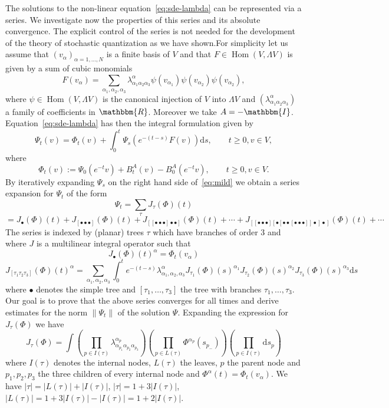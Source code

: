 \documentclass[11pt]{article}
\newcommand{\assign}{:=}
\newcommand{\mathd}{\mathrm{d}}
\newcommand{\tmop}[1]{\ensuremath{\operatorname{#1}}}
\begin{document}
The solutions to the non-linear equation~{\eqref{eq:sde-lambda}} can be
represented via a series. We investigate now the properties of this series and
its absolute convergence. The explicit control of the series is not needed for
the development of the theory of stochastic quantization as we have
shown.\quad For simplicity let us assume that $(v_{\alpha})_{\alpha = 1,
\ldots, N}$ is a finite basis of $V$ and that $F \in \tmop{Hom} (V, \Lambda
V)$ is given by a sum of cubic monomials
\[ F (v_{\alpha}) = \sum_{\alpha_1, \alpha_2, \alpha_3}
   \lambda^{\alpha}_{\alpha_1 \alpha_2 \alpha_3} \psi (v_{\alpha_1}) \psi
   (v_{\alpha_2}) \psi (v_{\alpha_2}), \]
where $\psi \in \tmop{Hom} (V, \Lambda V)$ is the canonical injection of $V$
into $\Lambda V$ and $(\lambda^{\alpha}_{\alpha_1 \alpha_2 \alpha_3})$ a
family of coefficients in $\mathbbm{R}$. Moreover we take $A = -\mathbbm{I}$.
Equation~{\eqref{eq:sde-lambda}} has then the integral formulation given by
\begin{equation}
  \Psi_t (v) = \Phi_t (v) + \int_0^t \Psi_s (e^{- (t - s)} F (v)) \mathd s,
  \qquad t \geqslant 0, v \in V, \label{eq:mild}
\end{equation}
where
\[ \Phi_t (v) \assign \Psi_0 (e^{- t} v) + B^A_t (v) - B^A_0 (e^{- t} v),
   \qquad t \geqslant 0, v \in V. \]
By iteratively expanding $\Psi_s$ on the right hand side of~{\eqref{eq:mild}}
we obtain a series expansion for $\Psi_t$ of the form
\begin{equation}
  \Psi_t = \sum_{\tau} J_{\tau} (\Phi) (t) \label{eq:sums}
\end{equation}
\[ = J_{\bullet} (\Phi) (t) + J_{[\bullet \bullet \bullet]} (\Phi) (t) +
   J_{[[\bullet \bullet \bullet] \bullet \bullet]} (\Phi) (t) + \cdots +
   J_{[[\bullet \bullet \bullet] [\bullet [\bullet \bullet [\bullet \bullet
   \bullet]] \bullet] \bullet]} (\Phi) (t) + \cdots \]
The series is indexed by (planar) trees $\tau$ which have branches of order 3
and where $J$ is a multilinear integral operator such that
\[ J_{\bullet} (\Phi) (t)^{\alpha} = \Phi_t (v_{\alpha}) \]
\[ J_{[\tau_1 \tau_2 \tau_3]} (\Phi) (t)^{\alpha} = \sum_{\alpha_1, \alpha_2,
   \alpha_3} \int_0^t e^{- (t - s)} \lambda^{\alpha}_{\alpha_1, \alpha_2,
   \alpha_3} J_{\tau_1} (\Phi) (s)^{\alpha_1} J_{\tau_2} (\Phi) (s)^{\alpha_2}
   J_{\tau_3} (\Phi) (s)^{\alpha_3} \mathd s \]
where $\bullet$ denotes the simple tree and $[\tau_1, \ldots, \tau_3]$ the
tree with branches $\tau_1, \ldots, \tau_3$. Our goal is to prove that the
above series converges for all times and derive estimates for the norm $\|
\Psi_t \|$ of the solution $\Psi$. Expanding the expression for $J_{\tau}
(\Phi)$ we have
\[ J_{\tau} (\Phi) = \int \left( \prod_{p \in I (\tau)}
   \lambda^{\alpha_p}_{\alpha_{p_1} \alpha_{p_2} \alpha_{p_3}} \right) \left(
   \prod_{p \in L (\tau)} \Phi^{\alpha_p} (s_{p_-}) \right) \left( \prod_{p
   \in I (\tau)} \mathd s_p \right) \]
where $I (\tau)$ denotes the internal nodes, $L (\tau)$ the leaves, $p$ the
parent node and $p_1, p_2, p_3$ the three children of every internal node and
$\Phi^{\alpha} (t) = \Phi_t (v_{\alpha})$. We have $| \tau | = | L (\tau) | +
| I (\tau) |$, $| \tau | = 1 + 3 | I (\tau) |$, $| L (\tau) | = 1 + 3 | I
(\tau) | - | I (\tau) | = 1 + 2 | I (\tau) |$.
\end{document}
